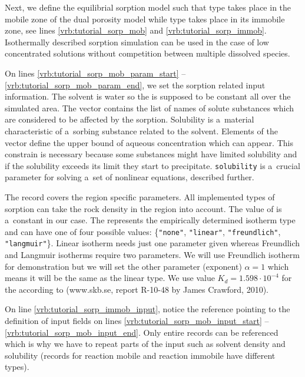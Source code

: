 Next, we define the equilibrial sorption model such that  type takes place in the mobile 
zone of the dual porosity model while  type takes place in its immobile zone, see lines \ref{vrb:tutorial_sorp_mob} and \ref{vrb:tutorial_sorp_immob}.
Isothermally described sorption simulation can be used in the case of low concentrated solutions without competition between multiple dissolved species.

On lines \ref{vrb:tutorial_sorp_mob_param_start} -- \ref{vrb:tutorial_sorp_mob_param_end}, we set the sorption related input information. The solvent is water so the  
is supposed to be constant all over the simulated area. The vector  
contains the list of names of solute substances which are considered to be affected by the sorption.
Solubility is a~material characteristic of a~sorbing substance related to the solvent. Elements of the vector 
 define the upper bound of aqueous concentration which can appear.
This constrain is necessary because some substances might have limited solubility and if the solubility exceeds 
its limit they start to precipitate. {\tt solubility} is a~crucial parameter for solving a~set of nonlinear 
equations, described further. 

The record  covers the region specific parameters.
All implemented types of sorption can take the rock density in the region into account. The value of 
 is a~constant in our case. 
The  represents the empirically determined isotherm 
type and can have one of four possible values: \{{\tt"none"}, {\tt"linear"}, {\tt"freundlich"}, {\tt"langmuir"}\}. 
Linear isotherm needs just one parameter given whereas Freundlich and Langmuir isotherms require two parameters. 
We will use Freundlich isotherm for demonstration but we will set the other parameter (exponent) $\alpha=1$ 
which means it will be the same as the linear type. We use value 
$K_d=1.598\cdot10^{-4}$  for the 
according to (www.skb.se, report R-10-48 by James Crawford, 2010).
 

On line \ref{vrb:tutorial_sorp_immob_input}, notice the reference pointing to the definition of input fields on lines \ref{vrb:tutorial_sorp_mob_input_start} -- \ref{vrb:tutorial_sorp_mob_input_end}. Only entire records 
can be referenced which is why we have to repeat parts of the input such as solvent density and solubility 
(records for reaction mobile and reaction immobile have different types).

